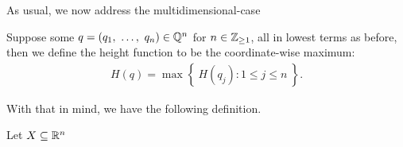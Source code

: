As usual, we now address the multidimensional-case
\begin{definition}
  Suppose some $q = (\vonevm{q}{n}) \in \Q^n$ for $n \in \Zgeq{1}$, all in lowest terms as before, then we define the height function to be the coordinate-wise maximum:
    \begin{align*}
      H(q) = \max{ \left\{ \ H(q_j) \colon 1 \leq j \leq n \ \right\} }.
    \end{align*}
  \label{defn:Qn_height}
\end{definition}

With that in mind, we have the following definition.
\begin{definition}
  Let $\XRn[X]{n}$
\end{definition}
